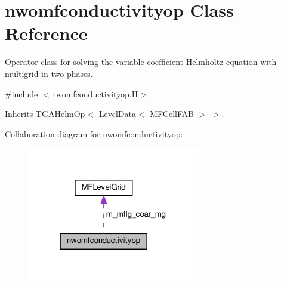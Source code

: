 \hypertarget{classnwomfconductivityop}{}\section{nwomfconductivityop Class Reference}
\label{classnwomfconductivityop}


Operator class for solving the variable-\/coefficient Helmholtz equation with multigrid in two phases.  




{\ttfamily \#include $<$nwomfconductivityop.\+H$>$}



Inherits T\+G\+A\+Helm\+Op$<$ Level\+Data$<$ M\+F\+Cell\+F\+A\+B $>$ $>$.



Collaboration diagram for nwomfconductivityop\+:\nopagebreak
\begin{figure}[H]
\begin{center}
\leavevmode
\includegraphics[width=214pt]{classnwomfconductivityop__coll__graph}
\end{center}
\end{figure}
